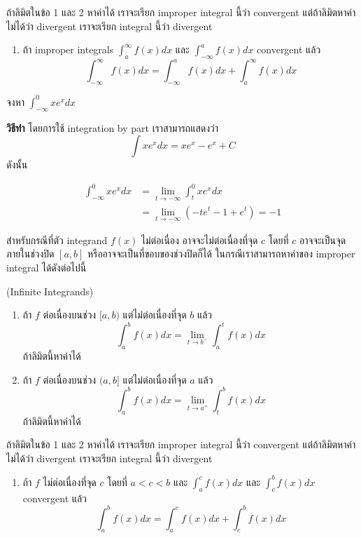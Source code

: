 \documentclass[
]{book}
\providecommand{\tightlist}{%
  \setlength{\itemsep}{0pt}\setlength{\parskip}{0pt}}
\begin{document}
ถ้าลิมิตในข้อ 1 และ 2 หาค่าได้ เราจะเรียก improper integral นี้ว่า convergent
แต่ถ้าลิมิตหาค่าไม่ได้ว่า divergent เราจะเรียก integral นี้ว่า divergent

\begin{enumerate}
\def\labelenumi{\arabic{enumi}.}
\setcounter{enumi}{2}
\tightlist
\item
  ถ้า improper integrals \(\int_{a}^{\infty} f(x) dx\) และ
  \(\int_{-\infty}^{a} f(x) dx\) convergent แล้ว
  \[\int_{-\infty}^{\infty} f(x) dx  = 
                \int_{-\infty}^{a} f(x) dx + \int_{a}^{\infty} f(x) dx\]
\end{enumerate}

จงหา \(\int_{-\infty}^0 x e^x dx\)

\textbf{วิธีทำ} โดยการใช้ integration by part เราสามารถแสดงว่า
\[\int x e^x dx = x e^x - e^x +C\] ดังนั้น

\begin{equation}
\begin{aligned}
         \int_{-\infty}^0 x e^x dx &=  \lim_{t \rightarrow -\infty} \int_{t}^0 x e^x dx \\
                        &=  \lim_{t \rightarrow -\infty} (-t e^t -1 + e^t) = -1
\end{aligned}
\end{equation}

สำหรับกรณีที่ตัว integrand \(f(x)\) ไม่ต่อเนื่อง อาจจะไม่ต่อเนื่องที่จุด \(c\) โดยที่
\(c\) อาจจะเป็นจุดภายในช่วงปิด \([a,b]\) หรืออาจจะเป็นที่ขอบของช่วงปิดก็ได้
ในกรณีเราสามารถหาค่าของ improper integral ได้ดังต่อไปนี้

\label{def-improper}
(Infinite Integrands)

\begin{enumerate}
\def\labelenumi{\arabic{enumi}.}
\item
  ถ้า \(f\) ต่อเนื่องบนช่วง \([a,b)\) แต่ไม่ต่อเนื่องที่จุด \(b\) แล้ว
  \[\int_{a}^b f(x) dx = \lim_{t \rightarrow b^{-}} \int_{a}^t f(x) dx\]
  ถ้าลิมิตนี้หาค่าได้
\item
  ถ้า \(f\) ต่อเนื่องบนช่วง \((a,b]\) แต่ไม่ต่อเนื่องที่จุด \(a\) แล้ว
  \[\int_{a}^b f(x) dx = \lim_{t \rightarrow a^{+}} \int_{t}^b f(x) dx\]
  ถ้าลิมิตนี้หาค่าได้
\end{enumerate}

ถ้าลิมิตในข้อ 1 และ 2 หาค่าได้ เราจะเรียก improper integral นี้ว่า convergent
แต่ถ้าลิมิตหาค่าไม่ได้ว่า divergent เราจะเรียก integral นี้ว่า divergent

\begin{enumerate}
\def\labelenumi{\arabic{enumi}.}
\setcounter{enumi}{2}
\tightlist
\item
  ถ้า \(f\) ไม่ต่อเนื่องที่จุด \(c\) โดยที่ \(a < c <b\) และ
  \(\int_{a}^{c} f(x) dx\) และ \(\int_{c}^{b} f(x) dx\) convergent แล้ว
  \[\int_{a}^{b} f(x) dx  = 
                \int_{a}^{c} f(x) dx + \int_{c}^{b} f(x) dx\]
\end{enumerate}
\end{document}
